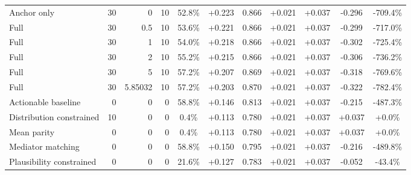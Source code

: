 \begin{table}[htbp]
\begin{tabular}{lrrrccccccc}
Anchor only & 30 & 0 & 10 & 52.8\% & +0.223 & 0.866 & +0.021 & +0.037 & -0.296 & -709.4\% \\
Full & 30 & 0.5 & 10 & 53.6\% & +0.221 & 0.866 & +0.021 & +0.037 & -0.299 & -717.0\% \\
Full & 30 & 1 & 10 & 54.0\% & +0.218 & 0.866 & +0.021 & +0.037 & -0.302 & -725.4\% \\
Full & 30 & 2 & 10 & 55.2\% & +0.215 & 0.866 & +0.021 & +0.037 & -0.306 & -736.2\% \\
Full & 30 & 5 & 10 & 57.2\% & +0.207 & 0.869 & +0.021 & +0.037 & -0.318 & -769.6\% \\
Full & 30 & 5.85032 & 10 & 57.2\% & +0.203 & 0.870 & +0.021 & +0.037 & -0.322 & -782.4\% \\
Actionable baseline & 0 & 0 & 0 & 58.8\% & +0.146 & 0.813 & +0.021 & +0.037 & -0.215 & -487.3\% \\
Distribution constrained & 10 & 0 & 0 & 0.4\% & +0.113 & 0.780 & +0.021 & +0.037 & +0.037 & +0.0\% \\
Mean parity & 0 & 0 & 0 & 0.4\% & +0.113 & 0.780 & +0.021 & +0.037 & +0.037 & +0.0\% \\
Mediator matching & 0 & 0 & 0 & 58.8\% & +0.150 & 0.795 & +0.021 & +0.037 & -0.216 & -489.8\% \\
Plausibility constrained & 0 & 0 & 0 & 21.6\% & +0.127 & 0.783 & +0.021 & +0.037 & -0.052 & -43.4\% \\
\bottomrule
\end{tabular}
\end{table}